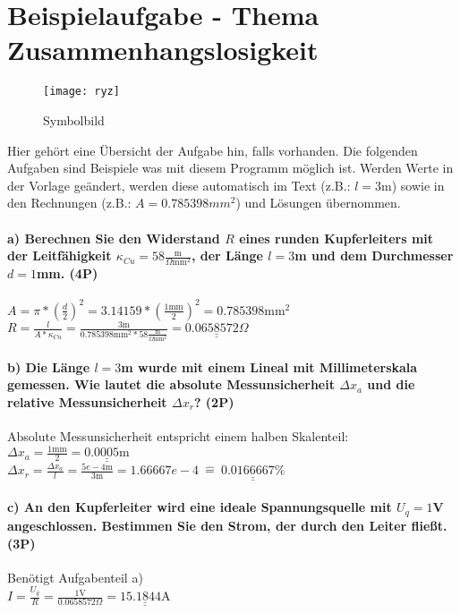 \documentclass{article}
\begin{document}
\part*{Beispielaufgabe - Thema Zusammenhangslosigkeit}

\begin{wrapfigure}{r}{0.3\textwidth}
\centering
\texttt{[image: ryz]}
\caption*{Symbolbild}
\end{wrapfigure}
Hier gehört eine Übersicht der Aufgabe hin, falls vorhanden. Die folgenden Aufgaben sind Beispiele was mit diesem Programm möglich ist. Werden Werte in der Vorlage geändert, werden diese automatisch im Text (z.B.: $l= 3$m) sowie in den Rechnungen (z.B.: $A= 0.785398mm^2$) und Lösungen übernommen.\\
\subsection*{a) Berechnen Sie den Widerstand $R$ eines runden Kupferleiters mit der Leitfähigkeit $\kappa_{Cu}= 58\frac{\text{m}}{\Omega\text{mm}^2}$, der Länge $l = 3$m und dem Durchmesser $d = 1$mm. (4P)}

$
                    A=\pi*(\frac{d}{2})^2= 3.14159*(\frac{ 1\text{mm}}{2})^2= 0.785398\text{mm}^2
                    $\\\hfill \break$
                    R=\frac{l}{A*\kappa_{Cu}}=\frac{ 3\text{m}}{ 0.785398\text{mm}^2* 58\frac{\text{m}}{\Omega\text{mm}^2}}=\underline{\underline{ 0.0658572\Omega}}
                    $\\
\subsection*{b) Die Länge $l= 3$m wurde mit einem Lineal mit Millimeterskala gemessen. Wie lautet die absolute Messunsicherheit $\Delta x_a$ und die relative Messunsicherheit $\Delta x_r$? (2P)}

Absolute Messunsicherheit entspricht einem halben Skalenteil:\\\hfill \break$
                    \Delta x_a=\frac{1\text{mm}}{2}=\underline{\underline{0.0005\text{m}}}
                    $\\\hfill \break$
                    \Delta x_r=\frac{\Delta x_a}{l}=\frac{ 5e-4\text{m}}{ 3\text{m}}= 1.66667e-4\ \hat{=}\ \underline{\underline{ 0.0166667\%}}$\\
\subsection*{c) An den Kupferleiter wird eine ideale Spannungsquelle mit $U_q= 1$V angeschlossen. Bestimmen Sie den Strom, der durch den Leiter fließt. (3P)}

Benötigt Aufgabenteil a)\\\hfill \break$
                    I=\frac{U_q}{R}=\frac{ 1\text{V}}{ 0.0658572\Omega}=\underline{\underline{ 15.1844\text{A}}}
                    $\\
\end{document}
